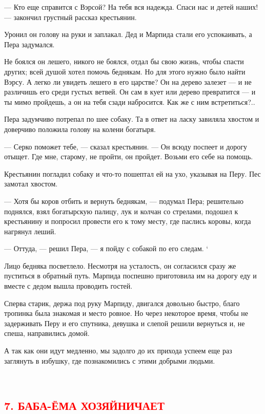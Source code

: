 \documentclass[oneside,final,14pt]{extreport}
\begin{document}
	— Кто еще справится с Вэрсой? На тебя вся надежда. Спаси нас и детей наших! — закончил грустный рассказ крестьянин.
	
	Уронил он голову на руки и заплакал. Дед и Марпида стали его успокаивать, а Пера задумался.
	
	Не боялся он лешего, никого не боялся, отдал бы свою жизнь, чтобы спасти других; всей душой хотел помочь беднякам. Но для этого нужно было найти Вэрсу. А легко ли увидеть лешего в его царстве? Он на дерево залезет — и не различишь его среди густых ветвей. Он сам в кует или дерево превратится — и ты мимо пройдешь, а он на тебя сзади набросится. Как же с ним встретиться?..
	
	Пера задумчиво потрепал по шее собаку. Та в ответ на ласку завиляла хвостом и доверчиво положила голову на колени богатыря.
	
	— Серко поможет тебе, — сказал крестьянин. — Он всюду поспеет и дорогу отыщет. Где мне, старому, не пройти, он пройдет. Возьми его себе на помощь.
	
	Крестьянин погладил собаку и что-то пошептал ей на ухо, указывая на Перу. Пес замотал хвостом.
	
	— Хотя бы коров отбить и вернуть беднякам, — подумал Пера; решительно поднялся, взял богатырскую палицу, лук и колчан со стрелами, подошел к крестьянину и попросил провести его к тому месту, где паслись коровы, когда нагрянул леший.
	
	— Оттуда, — решил Пера, — я пойду с собакой по его следам. `
	
	Лицо бедняка посветлело. Несмотря на усталость, он согласился сразу же пуститься в обратный путь. Марпида поспешно приготовила им на дорогу еду и вместе с дедом вышла проводить гостей.
	
	Сперва старик, держа под руку Марпиду, двигался довольно быстро, благо тропинка была знакомая и место ровное. Но через некоторое время, чтобы не задерживать Перу и его спутника, девушка и слепой решили вернуться и, не спеша, направились домой.
	
	А так как они идут медленно, мы задолго до их прихода успеем еще раз заглянуть в избушку, где познакомились с этими добрыми людьми.
	
	\
	{%
		\centering
		\subsection*{\textcolor{red}{7. БАБА-ЁМА ХОЗЯЙНИЧАЕТ}}
	}
	
\end{document}
